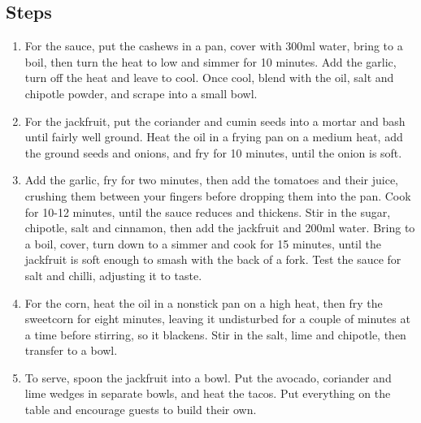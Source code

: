 \documentclass{book}
\begin{document}
\subsection*{Steps}
\begin{enumerate}
\item For the sauce, put the cashews in a pan, cover with 300ml water, bring to a boil, then turn the heat to low and simmer for 10 minutes. Add the garlic, turn off the heat and leave to cool. Once cool, blend with the oil, salt and chipotle powder, and scrape into a small bowl.
\item For the jackfruit, put the coriander and cumin seeds into a mortar and bash until fairly well ground. Heat the oil in a frying pan on a medium heat, add the ground seeds and onions, and fry for 10 minutes, until the onion is soft.
\item Add the garlic, fry for two minutes, then add the tomatoes and their juice, crushing them between your fingers before dropping them into the pan. Cook for 10-12 minutes, until the sauce reduces and thickens. Stir in the sugar, chipotle, salt and cinnamon, then add the jackfruit and 200ml water. Bring to a boil, cover, turn down to a simmer and cook for 15 minutes, until the jackfruit is soft enough to smash with the back of a fork. Test the sauce for salt and chilli, adjusting it to taste.
\item For the corn, heat the oil in a nonstick pan on a high heat, then fry the sweetcorn for eight minutes, leaving it undisturbed for a couple of minutes at a time before stirring, so it blackens. Stir in the salt, lime and chipotle, then transfer to a bowl.
\item To serve, spoon the jackfruit into a bowl. Put the avocado, coriander and lime wedges in separate bowls, and heat the tacos. Put everything on the table and encourage guests to build their own.
\end{enumerate}
\newpage
\end{document}
